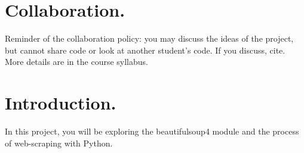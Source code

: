 \documentclass[11pt, letterpaper, onecolumn, oneside, final]{article}
\begin{document}
    \maketitle

    

    \section{Collaboration.} Reminder of the collaboration policy: you may discuss the ideas of the project, but cannot share code or look at another student’s code. If you discuss, cite. More details are in the course syllabus. 

    \section{Introduction.} In this project, you will be exploring the {\consolas beautifulsoup4} module and the process of web-scraping with Python.
     
\end{document}
